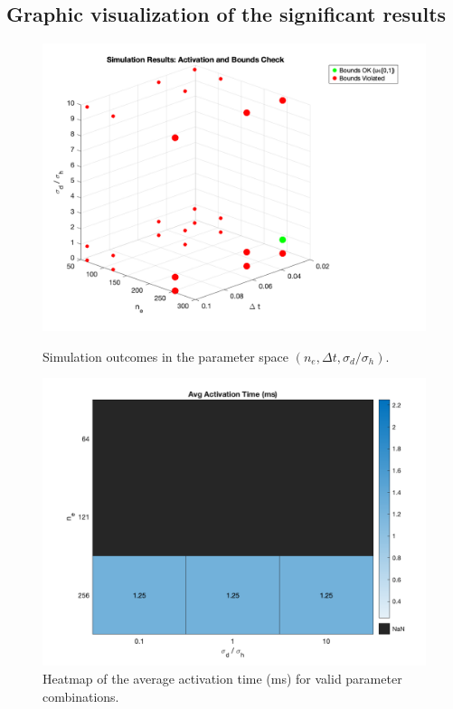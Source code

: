 \documentclass[12pt,a4paper]{article}
\begin{document}
\subsection{Graphic visualization of the significant results}
\begin{figure}[H]
    \centering
    \begin{minipage}{0.55\textwidth}
        \centering
        \includegraphics[width=\textwidth]{../Assets/sim_results.png}
        \caption{Simulation outcomes in the parameter space $(n_e, \Delta t, \sigma_d/\sigma_h)$.}
        \label{fig:bounds-check}
    \end{minipage}
    \hfill
    \begin{minipage}{0.4\textwidth}
        \centering
        \includegraphics[width=\textwidth]{../Assets/heatmap.png}
        \caption{Heatmap of the average activation time (ms) for valid parameter combinations.}
        \label{fig:activation-heatmap}
    \end{minipage}
\end{figure}
\end{document}
